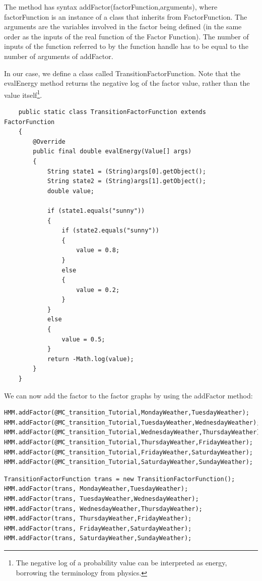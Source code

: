 \fi

\ifjava

The method has syntax addFactor(factorFunction,arguments), where factorFunction is an instance of a class that inherits from FactorFunction.  The arguments are the variables involved in the factor being defined (in the same order as the inputs of the real function of the Factor Function). The number of inputs of the function referred to by the function handle has to be equal to the number of arguments of addFactor.

In our case, we define a class called TransitionFactorFunction.  Note that the evalEnergy method returns the negative log of the factor value, rather than the value itself\footnote{The negative log of a probability value can be interpreted as energy, borrowing the terminology from physics.}.

\begin{lstlisting}
	public static class TransitionFactorFunction extends FactorFunction
	{
		@Override
		public final double evalEnergy(Value[] args)
		{
			String state1 = (String)args[0].getObject();
			String state2 = (String)args[1].getObject();
			double value;
			
			if (state1.equals("sunny"))
			{
				if (state2.equals("sunny"))
				{
					value = 0.8;
				}
				else
				{
					value = 0.2;
				}
			}
			else
			{
				value = 0.5;
			}
			return -Math.log(value);
		}
	}
\end{lstlisting}

\fi

We can now add the factor to the factor graphs by using the addFactor method:

\ifmatlab

\begin{lstlisting}
HMM.addFactor(@MC_transition_Tutorial,MondayWeather,TuesdayWeather);
HMM.addFactor(@MC_transition_Tutorial,TuesdayWeather,WednesdayWeather);
HMM.addFactor(@MC_transition_Tutorial,WednesdayWeather,ThursdayWeather);
HMM.addFactor(@MC_transition_Tutorial,ThursdayWeather,FridayWeather);
HMM.addFactor(@MC_transition_Tutorial,FridayWeather,SaturdayWeather);
HMM.addFactor(@MC_transition_Tutorial,SaturdayWeather,SundayWeather);
\end{lstlisting}

\fi

\ifjava

\begin{lstlisting}
TransitionFactorFunction trans = new TransitionFactorFunction();
HMM.addFactor(trans, MondayWeather,TuesdayWeather);
HMM.addFactor(trans, TuesdayWeather,WednesdayWeather);
HMM.addFactor(trans, WednesdayWeather,ThursdayWeather);
HMM.addFactor(trans, ThursdayWeather,FridayWeather);
HMM.addFactor(trans, FridayWeather,SaturdayWeather);
HMM.addFactor(trans, SaturdayWeather,SundayWeather);
\end{lstlisting}

